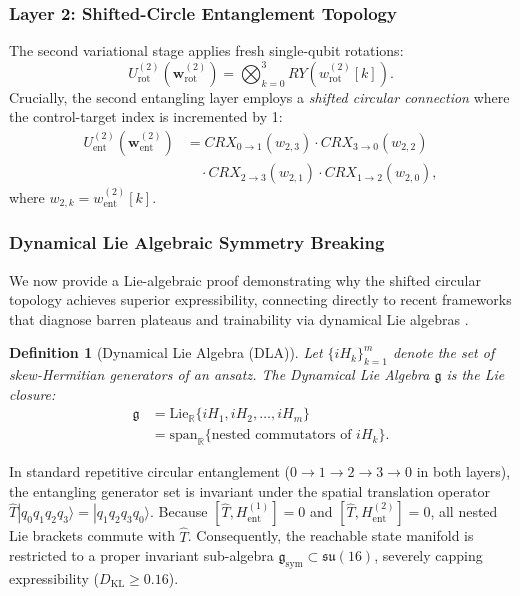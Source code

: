 \documentclass[journal]{IEEEtran}
\newtheorem{definition}{Definition}
\begin{document}
\subsubsection{Layer 2: Shifted-Circle Entanglement Topology}
The second variational stage applies fresh single-qubit rotations:
\begin{equation}
U_{\mathrm{rot}}^{(2)}(\mathbf{w}_{\mathrm{rot}}^{(2)}) = \bigotimes_{k=0}^3 RY\left(w_{\mathrm{rot}}^{(2)}[k]\right).
\label{eq:rot_layer2}
\end{equation}
Crucially, the second entangling layer employs a \textit{shifted circular connection} where the control-target index is incremented by 1:
\begin{align}
U_{\mathrm{ent}}^{(2)}(\mathbf{w}_{\mathrm{ent}}^{(2)}) &= CRX_{0 \to 1}(w_{2,3}) \cdot CRX_{3 \to 0}(w_{2,2}) \nonumber \\
&\quad \cdot CRX_{2 \to 3}(w_{2,1}) \cdot CRX_{1 \to 2}(w_{2,0}),
\label{eq:ent_layer2}
\end{align}
where $w_{2,k} = w_{\mathrm{ent}}^{(2)}[k]$.

\subsubsection{Dynamical Lie Algebraic Symmetry Breaking}
We now provide a Lie-algebraic proof demonstrating why the shifted circular topology achieves superior expressibility, connecting directly to recent frameworks that diagnose barren plateaus and trainability via dynamical Lie algebras \cite{larocca2025diagnosing}.

\begin{definition}[Dynamical Lie Algebra (DLA)]
Let $\{i H_k\}_{k=1}^m$ denote the set of skew-Hermitian generators of an ansatz. The Dynamical Lie Algebra $\mathfrak{g}$ is the Lie closure:
\begin{align}
\mathfrak{g} &= \mathrm{Lie}_{\mathbb{R}}\{i H_1, i H_2, \dots, i H_m\} \nonumber \\
&= \mathrm{span}_{\mathbb{R}}\{ \text{nested commutators of } i H_k \}.
\label{eq:dla_definition}
\end{align}
\end{definition}

In standard repetitive circular entanglement ($0 \to 1 \to 2 \to 3 \to 0$ in both layers), the entangling generator set is invariant under the spatial translation operator $\hat{T}|q_0 q_1 q_2 q_3\rangle = |q_1 q_2 q_3 q_0\rangle$. Because $[\hat{T}, H_{\mathrm{ent}}^{(1)}] = 0$ and $[\hat{T}, H_{\mathrm{ent}}^{(2)}] = 0$, all nested Lie brackets commute with $\hat{T}$. Consequently, the reachable state manifold is restricted to a proper invariant sub-algebra $\mathfrak{g}_{\mathrm{sym}} \subset \mathfrak{su}(16)$, severely capping expressibility ($D_{\mathrm{KL}} \ge 0.16$).
\end{document}
